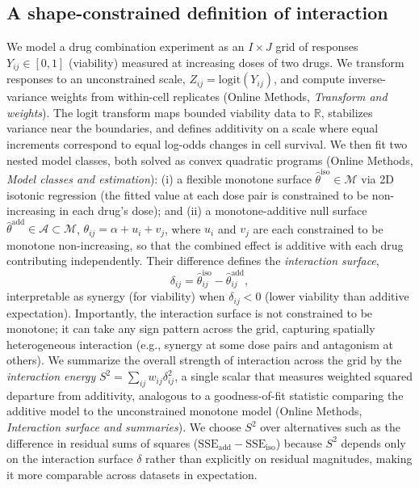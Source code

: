 \documentclass[pdflatex,sn-nature]{sn-jnl}%
\begin{document}
\subsection{A shape-constrained definition of interaction}

We model a drug combination experiment as an $I\times J$ grid of responses $Y_{ij}\in[0,1]$ (viability) measured at increasing doses of two drugs.
We transform responses to an unconstrained scale, $Z_{ij}=\mathrm{logit}(Y_{ij})$, and compute inverse-variance weights from within-cell replicates (Online Methods, \emph{Transform and weights}).
The logit transform maps bounded viability data to $\mathbb{R}$, stabilizes variance near the boundaries, and defines additivity on a scale where equal increments correspond to equal log-odds changes in cell survival.
We then fit two nested model classes, both solved as convex quadratic programs (Online Methods, \emph{Model classes and estimation}):
(i) a flexible monotone surface $\hat\theta^{\mathrm{iso}}\in\mathcal{M}$ via 2D isotonic regression (the fitted value at each dose pair is constrained to be non-increasing in each drug's dose); and
(ii) a monotone-additive null surface $\hat\theta^{\mathrm{add}}\in\mathcal{A}\subset\mathcal{M}$, $\theta_{ij}=\alpha+u_i+v_j$, where $u_i$ and $v_j$ are each constrained to be monotone non-increasing, so that the combined effect is additive with each drug contributing independently.
Their difference defines the \emph{interaction surface},
\begin{equation}
\delta_{ij}=\hat\theta^{\mathrm{iso}}_{ij}-\hat\theta^{\mathrm{add}}_{ij},
\end{equation}
interpretable as synergy (for viability) when $\delta_{ij}<0$ (lower viability than additive expectation).
Importantly, the interaction surface is not constrained to be monotone; it can take any sign pattern across the grid, capturing spatially heterogeneous interaction (e.g., synergy at some dose pairs and antagonism at others).
We summarize the overall strength of interaction across the grid by the \emph{interaction energy} $S^2=\sum_{ij} w_{ij}\delta_{ij}^2$, a single scalar that measures weighted squared departure from additivity, analogous to a goodness-of-fit statistic comparing the additive model to the unconstrained monotone model (Online Methods, \emph{Interaction surface and summaries}).
We choose $S^2$ over alternatives such as the difference in residual sums of squares ($\mathrm{SSE}_{\mathrm{add}}-\mathrm{SSE}_{\mathrm{iso}}$) because $S^2$ depends only on the interaction surface $\delta$ rather than explicitly on residual magnitudes, making it more comparable across datasets in expectation.
\end{document}
